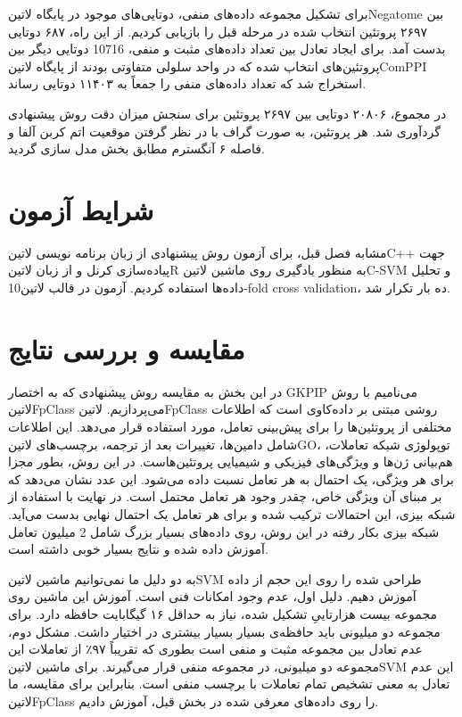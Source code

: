 برای تشکیل مجموعه داده‌های منفی، دوتایی‌های موجود در پایگاه ‌لاتین{Negatome} بین ۲۶۹۷ پروتئین انتخاب شده در مرحله قبل را بازیابی کردیم. از این راه، ۶۸۷ دوتایی بدست آمد. برای ایجاد تعادل بین تعداد داده‌های مثبت و منفی، 10716 دوتایی دیگر بین پروتئین‌های انتخاب شده که در واحد سلولی متفاوتی بودند از پایگاه ‌لاتین{ComPPI} استخراج شد که تعداد داده‌های منفی را جمعاً به ۱۱۴۰۳ دوتایی رساند.

در مجموع، ۲۰۸۰۶ دوتایی بین ۲۶۹۷ پروتئین برای سنجش میزان دقت روش پیشنهادی گردآوری شد. هر پروتئین، به صورت گراف با در نظر گرفتن موقعیت اتم کربن آلفا و فاصله ۶ آنگسترم مطابق بخش  مدل سازی گردید.

\section{شرایط آزمون}
مشابه فصل قبل، برای آزمون روش پیشنهادی از زبان برنامه نویسی ‌لاتین{C++} جهت پیاده‌سازی کرنل‌ و از زبان ‌لاتین{R} به منظور یادگیری روی ماشین ‌لاتین{C-SVM} و تحلیل داده‌ها استفاده کردیم. آزمون در قالب ‌لاتین{10-fold cross validation}، ده بار تکرار شد.

\section{مقایسه و بررسی نتایج}
در این بخش به مقایسه روش پیشنهادی که به اختصار GKPIP می‌نامیم با روش ‌لاتین{FpClass} می‌پردازیم. ‌لاتین{FpClass} روشی مبتنی بر داده‌کاوی است که اطلاعات مختلفی از پروتئین‌ها را برای پیش‌بینی تعامل، مورد استفاده قرار می‌دهد. این اطلاعات شامل دامین‌ها، تغییرات بعد از ترجمه، برچسب‌های ‌لاتین{GO}، توپولوژی شبکه تعاملات، هم‌بیانی ژن‌ها و ویژگی‌های فیزیکی و شیمیایی پروتئین‌هاست. در این روش، بطور مجزا برای هر ويژگی، یک احتمال به هر تعامل نسبت داده می‌شود. این عدد نشان می‌دهد که بر مبنای آن ویژگی خاص، چقدر وجود هر تعامل محتمل است. در نهایت با استفاده از شبکه بیزی، این احتمالات ترکیب شده و برای هر تعامل یک احتمال نهایی بدست می‌آید.  شبکه بیزی بکار رفته در این روش، روی داده‌های بسیار بزرگ شامل 2 میلیون تعامل آموزش داده شده و  نتایج بسیار خوبی داشته است.

به دو دلیل ما نمی‌توانیم ماشین ‌لاتین{SVM} طراحی شده را روی این حجم از داده آموزش دهیم. دلیل اول، عدم وجود امکانات فنی است. آموزش این ماشین روی مجموعه بیست هزارتاییِ تشکیل شده، نیاز به حداقل ۱۶ گیگابایت حافظه دارد. برای مجموعه دو میلیونی باید حافظه‌ی بسیار بسیار بیشتری در اختیار داشت. مشکل دوم، عدم تعادل بین مجموعه مثبت و منفی است بطوری که  تقریباً ۹۷٪ از تعاملات این مجموعه دو میلیونی، در مجموعه منفی قرار می‌گیرند. برای ماشین ‌لاتین{SVM} این عدم تعادل به معنی تشخیص تمام تعاملات با برچسب منفی است. بنابراین برای مقایسه، ما ‌لاتین{FpClass} را روی داده‌های معرفی شده در بخش قبل، آموزش دادیم.

